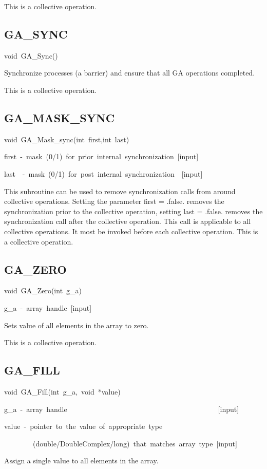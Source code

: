 This is a collective operation. 


\subsection*{\label{sub:GA_SYNC}GA\_SYNC}
\begin{lyxcode}
void~GA\_Sync()
\end{lyxcode}
Synchronize processes (a barrier) and ensure that all GA operations
completed.

This is a collective operation.


\subsection*{GA\_MASK\_SYNC}
\begin{lyxcode}
void~GA\_Mask\_sync(int~first,int~last)



first~-~mask~(0/1)~for~prior~internal~synchronization~{[}input{]}~

last~~-~mask~(0/1)~for~post~internal~synchronization~~{[}input{]}
\end{lyxcode}
This subroutine can be used to remove synchronization calls from around
collective operations. Setting the parameter first = .false. removes
the synchronization prior to the collective operation, setting last
= .false. removes the synchronization call after the collective operation.
This call is applicable to all collective operations. It most be invoked
before each collective operation. This is a collective operation. 


\subsection*{\label{sub:GA_ZERO}GA\_ZERO}
\begin{lyxcode}
void~GA\_Zero(int~g\_a)



g\_a~-~array~handle~{[}input{]}
\end{lyxcode}
Sets value of all elements in the array to zero.

This is a collective operation. 


\subsection*{\label{sub:GA_FILL}GA\_FILL}
\begin{lyxcode}
void~GA\_Fill(int~g\_a,~void~{*}value)



g\_a~-~array~handle~~~~~~~~~~~~~~~~~~~~~~~~~~~~~~~~~~~~~~~~~~{[}input{]}~

value~-~pointer~to~the~value~of~appropriate~type~

~~~~~~~~(double/DoubleComplex/long)~that~matches~array~type~{[}input{]}
\end{lyxcode}
Assign a single value to all elements in the array.

